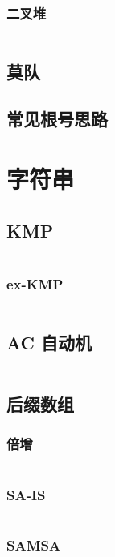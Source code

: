 \documentclass[a4paper, twoside]{article}
\begin{document}
\begin{multicols}{2}
				\subsubsection{二叉堆}
					\inputminted{cpp}{../src/datastructure/二叉堆.cpp}
			
			\subsection{莫队}
				
	
			\subsection{常见根号思路}
				

		\newpage
		\section{字符串}
			\subsection{KMP}
				\inputminted{cpp}{../src/string/KMP.cpp}
				
				\subsubsection{ex-KMP}
					\inputminted{cpp}{../src/string/exKMP.cpp}

			\subsection{AC 自动机}
				\inputminted{cpp}{../src/string/AC自动机.cpp}

			\subsection[后缀数组 SA]{后缀数组}
				\subsubsection{倍增}
					\inputminted{cpp}{../src/string/sa.cpp}	

				\subsubsection{SA-IS}
					\inputminted{cpp}{../src/string/sais.cpp}
			
				\subsubsection{SAMSA}
				 	\inputminted{cpp}{../src/string/SAMSA.cpp}


\end{multicols}
\end{document}
